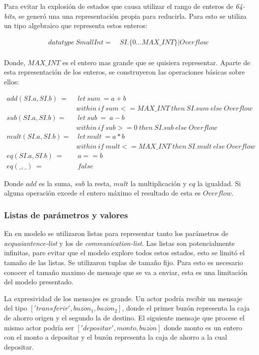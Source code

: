 Para evitar la explosión de estados que causa utilizar el rango de enteros de \textit{64-bits}, se generó una una representación propia para reducirla. Para esto se utiliza un tipo algebraico que representa estos enteros:

\begin{align*}
datatype\ SmallInt =&\ SI.\{0 \ldots MAX\_INT\} | Overflow \\
\end{align*}

Donde, $MAX\_INT$ es el entero mas grande que se quisiera representar. Aparte de esta representación de los enteros, se construyeron las operaciones básicas sobre ellos:

\begin{align*}
add(SI.a, SI.b)\ =&\ let\ sum\ = a + b \\
&within\ if\ sum <= MAX\_INT\ then\ SI.sum\ else\ Overflow  \\
%
sub(SI.a, SI.b) =&\ let\ sub\ =\ a - b \\
& within\ if\ sub >= 0\ then\ SI.sub\ else\ Overflow \\
%
mult(SI.a, SI.b) =&\ let\ mult\ = a * b \\
& within\ if\ mult <= MAX\_INT\ then\ SI.mult\ else\ Overflow \\
eq(SI.a, SI.b)\ =&\ a == b \\
eq(\_, \_)\ =&\ false
\end{align*}

Donde $add$ es la suma, $sub$ la resta, $mult$ la multiplicación y $eq$ la igualdad. Si alguna operación excede el entero máximo el resultado de esta es $Overflow$.

\subsubsection*{Listas de parámetros y valores}
En en modelo se utilizaron listas para representar tanto los parámetros de \textit{acquaiantence-list} y los de \textit{communication-list}. Las listas son potencialmente infinitas, pare evitar que el modelo explore todos estos estados, esto se limitó el tamaño de las listas. Se utilizaron tuplas de tamaño fijo. Para esto es necesario conocer el tamaño maximo de mensaje que se va a enviar, esta es una limitación del modelo presentado.

La expresividad de los mensajes es grande. Un actor podría recibir un mensaje del tipo $['transferir', buz\acute{o}n_1, buz\acute{o}n_2]$, donde el primer buzón representa la caja de ahorro origen y el segundo la de destino. El siguiente mensaje que procese el mismo actor podría ser $['depositar', monto, buz\acute{o}n]$ donde monto es un entero con el monto a depositar y el buzón representa la caja de ahorro a la cual depositar. 

